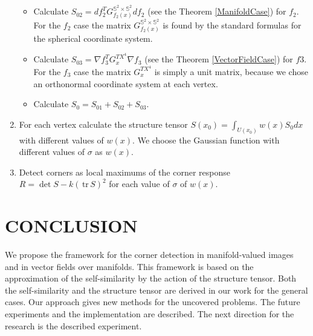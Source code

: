 \documentclass[a4paper,twoside]{article}
\newcommand {\tr}{{\,}\mathrm{tr}{\,}}
\begin{document}
\begin{enumerate}
\begin{itemize}
		\item Calculate $S_{02}=df_2^T G^{\mathbb{S}^2\times\mathbb{S}^2}_{f_2(x)} df_2$ (see the Theorem \ref{ManifoldCase}) for $f_2$. For the $f_2$ case the matrix $G^{\mathbb{S}^2\times\mathbb{S}^2}_{f_2(x)}$ is found by the standard formulas for the spherical coordinate system.
		\item Calculate $S_{03}=\nabla f_3^T G^{TX^4}_{x} \nabla f_3$ (see the Theorem \ref{VectorFieldCase}) for $f3$. For the $f_3$ case the matrix  $G^{TX^4}_{x}$ is simply a unit matrix, because we chose an orthonormal coordinate system at each vertex.
		\item Calculate $S_{0} = S_{01} + S_{02} + S_{03}$.
\end{itemize}
\item For each vertex calculate the structure tensor $S(x_0) = \int_{U(x_0)} w(x) S_{0} dx$ with different values of $w(x)$. We choose the Gaussian function with different values of $\sigma$ as $w(x)$.
\item Detect corners as local maximums of the corner response $R=\det S - k (\tr S)^2$ for each value of $\sigma$ of $w(x)$.
\end{enumerate}

\section{\uppercase{Conclusion}}
We propose the framework for the corner detection in manifold-valued images and in vector fields over manifolds. This framework is based on the approximation of the self-similarity by the action of the structure tensor. Both the self-similarity and the structure tensor are derived in our work for the general cases. Our approach gives new methods for the uncovered problems. The future experiments and the implementation are described. The next direction for the research is the described experiment.


{\small
}
\end{document}
